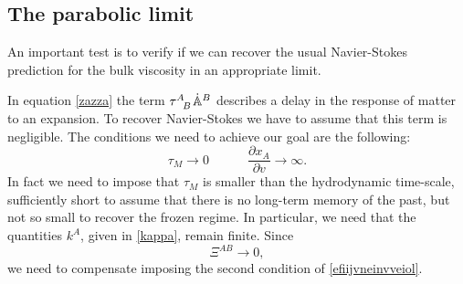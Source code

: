 \documentclass[useAMS,usenatbib,prd,twocolumn,nofootinbib]{revtex4-1}
\newcommand{\spc}{\quad \quad \quad}
\begin{document}
\subsection{The parabolic limit}\label{paraparaparapara}

An important test is to verify if we can recover the usual Navier-Stokes prediction for the bulk viscosity in an appropriate limit. 

In equation \eqref{zazza} the term $\tau\indices{^A _B} \dot{\mathbb{A}}^B$ describes a delay in the response of matter to an expansion. To recover Navier-Stokes we have to assume that this term is negligible. The conditions we need to achieve our goal are the following:
\begin{equation}\label{efiijvneinvveiol}
\tau_M \longrightarrow 0  \spc  \dfrac{\partial x_A}{\partial v} \longrightarrow  \infty.
\end{equation}
In fact we need to impose that $\tau_M$ is smaller than the hydrodynamic time-scale, sufficiently short to assume that there is no long-term memory of the past, but not so small to recover the frozen regime. In particular, we need that the quantities $k^A$, given in \eqref{kappa}, remain finite. Since  
\begin{equation}
\Xi^{AB} \longrightarrow 0,
\end{equation}
we need to compensate imposing the second condition of \eqref{efiijvneinvveiol}. 
\end{document}
